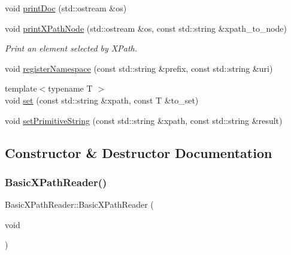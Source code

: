\begin{DoxyCompactItemize}
void \mbox{\hyperlink{classXMLXPathReader_1_1BasicXPathReader_ab4607adfbae13b0ce3c7e5b944342207}{print\+Doc}} (std\+::ostream \&os)
\item 
void \mbox{\hyperlink{classXMLXPathReader_1_1BasicXPathReader_afba694dbda7c2e1c26ca344085bfffb6}{print\+X\+Path\+Node}} (std\+::ostream \&os, const std\+::string \&xpath\+\_\+to\+\_\+node)
\begin{DoxyCompactList}\small\item\em Print an element selected by X\+Path. \end{DoxyCompactList}\item 
void \mbox{\hyperlink{classXMLXPathReader_1_1BasicXPathReader_a5991605f4cda926b146829be5798b037}{register\+Namespace}} (const std\+::string \&prefix, const std\+::string \&uri)
\item 
{\footnotesize template$<$typename T $>$ }\\void \mbox{\hyperlink{classXMLXPathReader_1_1BasicXPathReader_a4cf7407f107bf4f307b70af4cccbd30e}{set}} (const std\+::string \&xpath, const T \&to\+\_\+set)
\item 
void \mbox{\hyperlink{classXMLXPathReader_1_1BasicXPathReader_a76d2a9f9bc292c92558619e47b85dd4c}{set\+Primitive\+String}} (const std\+::string \&xpath, const std\+::string \&result)
\end{DoxyCompactItemize}


\subsection{Constructor \& Destructor Documentation}
\mbox{\label{classXMLXPathReader_1_1BasicXPathReader_a940138f7f52261b6190f2f23b73c648f}} 
\subsubsection{\texorpdfstring{BasicXPathReader()}{BasicXPathReader()}\hspace{0.1cm}{\footnotesize\ttfamily [1/8]}}
{\footnotesize\ttfamily Basic\+X\+Path\+Reader\+::\+Basic\+X\+Path\+Reader (\begin{DoxyParamCaption}\item[{void}]{ }\end{DoxyParamCaption})}

